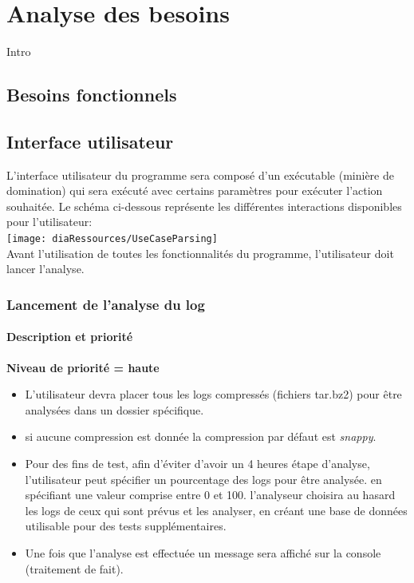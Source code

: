 \chapter{Analyse des besoins}

Intro

\section{Besoins fonctionnels}
\iffalse
\section{Interface utilisateur}
L'interface utilisateur du programme sera composé d'un exécutable (minière de domination) qui sera exécuté avec certains paramètres pour exécuter l'action souhaitée. Le schéma ci-dessous représente les différentes interactions disponibles pour l'utilisateur:\\

\texttt{[image: diaRessources/UseCaseParsing]}\\
Avant l'utilisation de toutes les fonctionnalités du programme, l'utilisateur doit lancer l'analyse.
\subsection{Lancement de l'analyse du log}
\subsubsection{Description et priorité}
\textbf{Niveau de priorité = haute}\\
\begin{itemize}
  \item L'utilisateur devra placer tous les logs compressés (fichiers tar.bz2) pour être analysées dans un dossier spécifique.
  \item si aucune compression est donnée la compression par défaut est \textit{snappy}.
    \item Pour des fins de test, afin d'éviter d'avoir un 4 heures étape d'analyse, l'utilisateur peut spécifier un pourcentage des logs pour être analysée. en spécifiant une valeur comprise entre 0 et 100. l'analyseur choisira au hasard les logs de ceux qui sont prévus et les analyser, en créant une base de données utilisable pour des tests supplémentaires.
    \item Une fois que l'analyse est effectuée un message sera affiché sur la console (traitement de fait).

\end{itemize}

